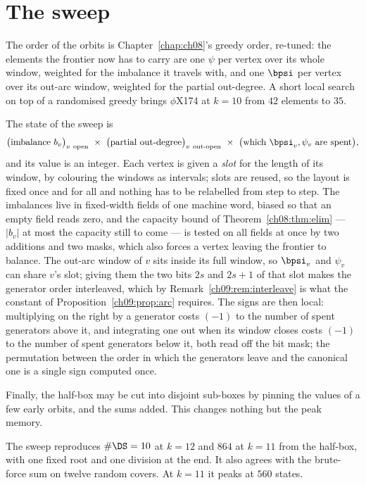 \section{The sweep}\label{ch09:sec:sweep}

The order of the orbits is Chapter~\ref{chap:ch08}'s greedy order, re-tuned: the elements the frontier now has
to carry are one $\psi$ per vertex over its whole window, weighted for the imbalance it travels
with, and one $\bpsi$ per vertex over its out-arc window, weighted for the partial out-degree.
A short local search on top of a randomised greedy brings $\phi$X174 at $k=10$ from $42$
elements to $35$.

The state of the sweep is
\[
\big(\text{imbalance }b_v\big)_{v\ \text{open}}\ \times\
\big(\text{partial out-degree}\big)_{v\ \text{out-open}}\ \times\
\big(\text{which }\bpsi_v,\psi_v\ \text{are spent}\big),
\]
and its value is an integer. Each vertex is given a \emph{slot} for the length of its window, by
colouring the windows as intervals; slots are reused, so the layout is fixed once and for all
and nothing has to be relabelled from step to step. The imbalances live in fixed-width fields of
one machine word, biased so that an empty field reads zero, and the capacity bound of Theorem~\ref{ch08:thm:elim}
---
$|b_v|$ at most the capacity still to come --- is tested on all fields at once by two additions
and two masks, which also forces a vertex leaving the frontier to balance. The out-arc window of
$v$ sits inside its full window, so $\bpsi_v$ and $\psi_v$ can share $v$'s slot; giving them the
two bits $2s$ and $2s+1$ of that slot makes the generator order interleaved, which by
Remark~\ref{ch09:rem:interleave} is what the constant of Proposition~\ref{ch09:prop:arc} requires. The
signs are then local: multiplying on the right by a generator costs $(-1)$ to the number of
spent generators above it, and integrating one out when its window closes costs $(-1)$ to the
number of spent generators below it, both read off the bit mask; the permutation between the
order in which the generators leave and the canonical one is a single sign computed once.

Finally, the half-box may be cut into disjoint sub-boxes by pinning the values of a few early
orbits, and the sums added. This changes nothing but the peak memory.

The sweep reproduces $\#\DS=10$ at $k=12$ and $864$ at $k=11$ from the half-box, with one
fixed root and one division at the end. It also agrees with the brute-force sum on twelve
random covers. At $k=11$ it peaks at $560$ states.


